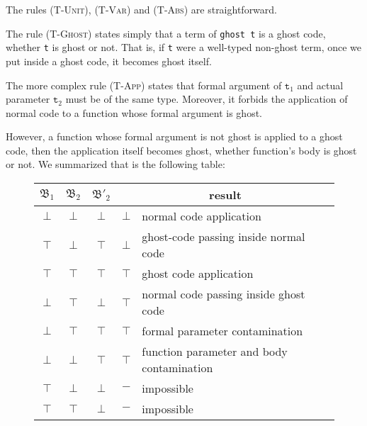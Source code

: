 	
										{}
										
	{}
										
The rules \textsc{(T-Unit)}, \textsc{(T-Var)} and \textsc{(T-Abs)} are straightforward.

The rule \textsc{(T-Ghost)} states simply that a term of \texttt{ghost t}
is a ghost code, whether \texttt{t} is ghost or not. That is, if \texttt{t} were a well-typed non-ghost term, once we put inside a ghost code, it becomes ghost itself. 

The more complex rule \textsc{(T-App)} states that formal argument of $\texttt{t}_{1}$ and actual parameter $\texttt{t}_{2}$ must be
of the same type. Moreover, it forbids the application of normal code
to a function whose formal argument is ghost.  

However, a function whose formal argument is not ghost is applied to a 
ghost code, then the application itself becomes ghost, whether function's
body is ghost or not. We summarized that is the following table:

\begin{figure}[H]
\begin{center}
\begin{tabular}{|c|c|c|c|l|}
\hline
$\mathfrak{B_{1}}$ & $\mathfrak{B_{2}}$ & $\mathfrak{B'_{2}}$
 &  \multicolumn{2}{c|}{result} \\
\hline
$\bot$ & $\bot$ & $\bot$ & $\bot$ &  normal code application \\ \hline
$\top$ & $\bot$ & $\top$ & $\bot$ &  ghost-code passing inside normal code
\\ \hline
$\top$ & $\top$ & $\top$ & $\top$ &  ghost code application \\ \hline
$\bot$ & $\top$ & $\bot$ & $\top$ &  normal code passing inside ghost code
 \\ \hline
 \rowcolor{lightgray} 
 $\bot$ & $\top$ & $\top$ & $\top$ &formal parameter contamination \\ \hline
  \rowcolor{lightgray} 
 $\bot$ & $\bot$ & $\top$ & $\top$ &function parameter and body contamination \\ \hline
  $\top$ & $\bot$ & $\bot$ & $-$ & impossible \\ \hline
 $\top$ & $\top$ & $\bot$ & $-$ & impossible \\ \hline
 
\end{tabular}
\end{center}
\end{figure}  


